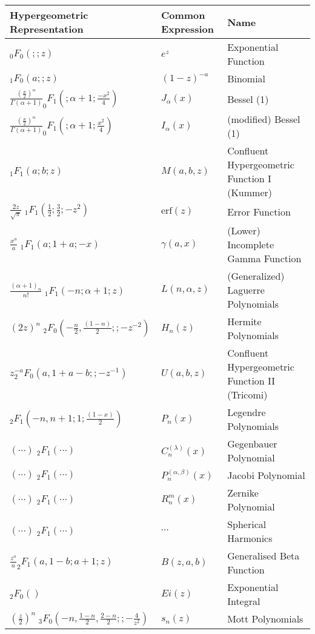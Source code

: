 \documentclass{article}
\begin{document}
\begin{table}[h]
\centering
\begin{tabular}{|p{4.5cm}|p{1.5cm}|p{5cm}|}
\hline
Hypergeometric \newline Representation & Common \newline Expression & Name\\
\hline
$_0F_0(;;z)$&$e^z$ & Exponential Function\\
$_1F_0(a;;z)$ & $(1-z)^{-a}$ & Binomial\\
$\frac{(\frac{x}{2})^\alpha}{\Gamma(\alpha+1)} _0F_1(;\alpha+1;\frac{-x^2}{4}) $ & $J_\alpha(x)$ & Bessel (1) \\
$\frac{(\frac{x}{2})^\alpha}{\Gamma(\alpha+1)} _0F_1(;\alpha+1;\frac{x^2}{4}) $ & $I_\alpha(x)$ & (modified) Bessel (1) \\
$_1F_1(a;b;z)$ & $M(a,b,z)$ & Confluent Hypergeometric \newline Function I (Kummer) \\
$\frac{2 z}{\sqrt{\pi}}\;_1 F_1(\frac{1}{2};\frac{3}{2};-z^2)$ & $\mathrm{erf}(z)$ & Error Function \\
$\frac{x^a}{a}\;_1F_1(a;1+a;-x)$ & $\gamma(a,x)$ & (Lower) Incomplete Gamma Function\\
$\frac{(\alpha+1)_n}{n!} \;_1F_1(-n;\alpha+1;z)$ & $L(n,\alpha,z)$ & (Generalized) Laguerre \newline Polynomials \\
$(2z)^n \;_2F_0(-\frac{n}{2},\frac{(1-n)}{2};;-z^{-2})$ & $H_n(z)$ & Hermite Polynomials\\
$z^{-a} _2F_0(a,1+a-b;;-z^{-1})$ & $U(a,b,z)$ & Confluent Hypergeometric \newline Function II (Tricomi) \\
$_2F_1(-n,n+1;1;\frac{(1-x)}{2})$ & $P_n(x)$ & Legendre Polynomials\\
$(\cdots)\;_2F_1(\cdots)$ & $C^{(\lambda)}_n(x)$ & Gegenbauer Polynomial\\
$(\cdots)\;_2F_1(\cdots)$ & $P^{(\alpha,\beta)}_n(x)$ & Jacobi Polynomial\\
$(\cdots)\;_2F_1(\cdots)$ & $R^m_n(x)$ & Zernike Polynomial \\
$(\cdots)\;_2F_1(\cdots)$ & $\cdots$ & Spherical Harmonics \\
$ \frac{z^a}{a} _2F_1(a,1-b;a+1;z)$  & $B(z,a,b)$ & Generalised Beta Function \\
$_2F_0()$ & $Ei(z)$ & Exponential Integral \\
$\left(\frac{z}{2}\right)^n\;_3F_0(-n,\frac{1-n}{2},\frac{2-n}{2};;-\frac{4}{z^2})$ & $s_n(z)$ & Mott Polynomials \\

\end{tabular}
\end{table}
\end{document}

